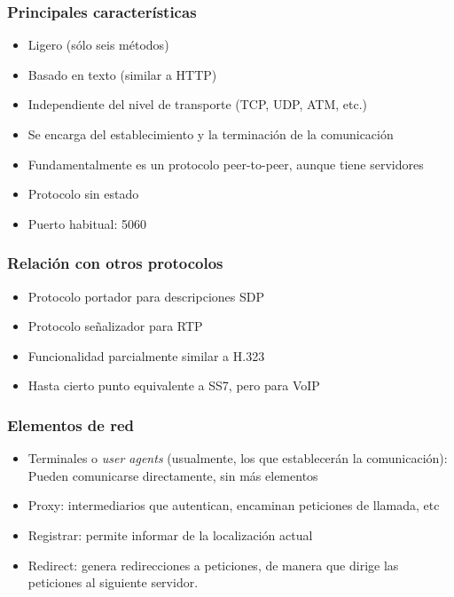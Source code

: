 \documentclass{beamer}
\begin{document}

\begin{frame}
\frametitle{Principales características}

\begin{itemize}
\item Ligero (sólo seis métodos)
\item Basado en texto (similar a HTTP)
\item Independiente del nivel de transporte (TCP, UDP, ATM, etc.)
\item Se encarga del establecimiento y la terminación de la
  comunicación
\item Fundamentalmente es un protocolo peer-to-peer, aunque tiene servidores
\item Protocolo sin estado
\item Puerto habitual: 5060
\end{itemize}

\end{frame}


\begin{frame}
\frametitle{Relación con otros protocolos}

\begin{itemize}
\item Protocolo portador para descripciones SDP
\item Protocolo señalizador para RTP
\item Funcionalidad parcialmente similar a H.323
\item Hasta cierto punto equivalente a SS7, pero para VoIP
\end{itemize}

\end{frame}


\begin{frame}
\frametitle{Elementos de red}

\begin{itemize}
\item Terminales o \emph{user agents} (usualmente, los que establecerán la
  comunicación): Pueden comunicarse directamente, sin más elementos
\item Proxy: intermediarios que autentican, encaminan peticiones de
  llamada, etc
\item Registrar: permite informar de la localización actual
\item Redirect: genera redirecciones a peticiones, de manera que dirige las peticiones al siguiente servidor.
\end{itemize}

\end{frame}
\end{document}
